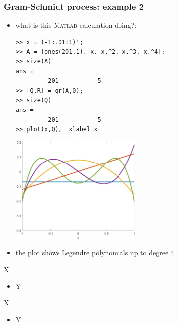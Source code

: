 \documentclass[10pt,hyperref]{beamer}
\newcommand{\Matlab}{\textsc{Matlab}\xspace}
\begin{document}
\begin{frame}[fragile]
\frametitle{Gram-Schmidt process: example 2}

\begin{itemize}
\item what is this \Matlab calculation doing?:

\medskip
\begin{Verbatim}[fontsize=\scriptsize]
>> x = (-1:.01:1)';
>> A = [ones(201,1), x, x.^2, x.^3, x.^4];
>> size(A)
ans =
         201           5
>> [Q,R] = qr(A,0);
>> size(Q)
ans =
         201           5
>> plot(x,Q),  xlabel x
\end{Verbatim}

\vspace{-15mm}
\hfill \includegraphics[width=0.5\textwidth]{figs/legendre} \quad 

\item the plot shows Legendre polynomials up to degree 4
\end{itemize}
\end{frame}


\begin{frame}{X}

\begin{itemize}
\item Y
\end{itemize}
\end{frame}

\begin{frame}{X}

\begin{itemize}
\item Y
\end{itemize}
\end{frame}
\end{document}
